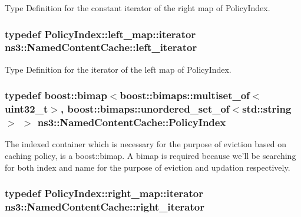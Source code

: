 Type Definition for the constant iterator of the right map of Policy\-Index. 

\hypertarget{classns3_1_1NamedContentCache_a0f52ee3d115d1b5fdd1201620b889b6e}{
\subsubsection[{left\-\_\-iterator}]{\setlength{\rightskip}{0pt plus 5cm}typedef Policy\-Index\-::left\-\_\-map\-::iterator {\bf ns3\-::\-Named\-Content\-Cache\-::left\-\_\-iterator}}}\label{classns3_1_1NamedContentCache_a0f52ee3d115d1b5fdd1201620b889b6e}


Type Definition for the iterator of the left map of Policy\-Index. 

\hypertarget{classns3_1_1NamedContentCache_a0b728ea2d4e0acbe431897b2374cfc8e}{
\subsubsection[{Policy\-Index}]{\setlength{\rightskip}{0pt plus 5cm}typedef boost\-::bimap$<$boost\-::bimaps\-::multiset\-\_\-of$<$uint32\-\_\-t$>$, boost\-::bimaps\-::unordered\-\_\-set\-\_\-of$<$std\-::string$>$ $>$ {\bf ns3\-::\-Named\-Content\-Cache\-::\-Policy\-Index}}}\label{classns3_1_1NamedContentCache_a0b728ea2d4e0acbe431897b2374cfc8e}


The indexed container which is necessary for the purpose of eviction based on caching policy, is a boost\-::bimap. A bimap is required because we'll be searching for both index and name for the purpose of eviction and updation respectively. 

\hypertarget{classns3_1_1NamedContentCache_a2c391c6013b29596a2ec5c62d0e413ed}{
\subsubsection[{right\-\_\-iterator}]{\setlength{\rightskip}{0pt plus 5cm}typedef Policy\-Index\-::right\-\_\-map\-::iterator {\bf ns3\-::\-Named\-Content\-Cache\-::right\-\_\-iterator}}}\label{classns3_1_1NamedContentCache_a2c391c6013b29596a2ec5c62d0e413ed}


